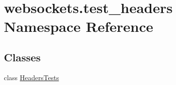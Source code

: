 \hypertarget{namespacewebsockets_1_1test__headers}{}\section{websockets.\+test\+\_\+headers Namespace Reference}
\label{namespacewebsockets_1_1test__headers}
\subsection*{Classes}
\begin{DoxyCompactItemize}
\item 
class \hyperlink{classwebsockets_1_1test__headers_1_1_headers_tests}{Headers\+Tests}
\end{DoxyCompactItemize}
